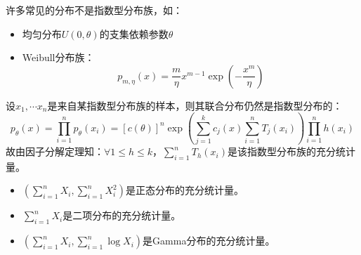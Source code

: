 \documentclass[UTF-8]{ctexbeamer}
\begin{document}
\begin{frame}
  许多常见的分布不是指数型分布族，如：
  \begin{itemize}
  \item 均匀分布$U(0,\theta)$的支集依赖参数$\theta$
  \item Weibull分布族：
    \[p_{m,\eta}(x)=\frac{m}{\eta}x^{m-1}\exp(-\frac{x^{m}}{\eta})\]
  \end{itemize}
\end{frame}

\begin{frame}
  设$x_{1},\cdots x_{n}$是来自某指数型分布族的样本，则其联合分布仍然是指数型分布的：
  \[p_{\theta}(x)=\prod_{i=1}^{n}p_{\theta}(x_{i})=[c(\theta)]^{n}\exp(\sum_{j=1}^{k}c_{j}(x)\sum_{i=1}^{n}T_{j}(x_{i}))\prod_{i=1}^{n}h(x_{i})\]
  故由因子分解定理知：$\forall 1\leq h\leq k$，$\sum_{i=1}^{n}T_{h}(x_{i})$是该指数型分布族的充分统计量。

  \begin{Eg}
    \begin{itemize}
    \item $(\sum_{i=1}^{n}X_{i},\sum_{i=1}^{n}X_{i}^{2})$是正态分布的充分统计量。
    \item $\sum_{i=1}^{n}X_{i}$是二项分布的充分统计量。
      
    \item $(\sum_{i=1}^{n}X_{i},\sum_{i=1}^{n}\log X_{i})$是Gamma分布的充分统计量。
    \end{itemize}
  \end{Eg}





\end{frame}
\end{document}
